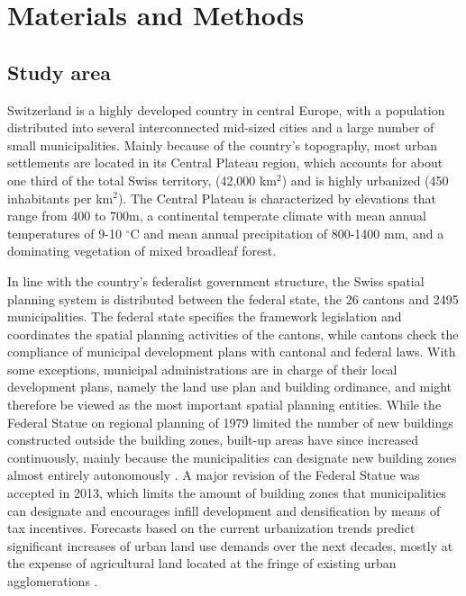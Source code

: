 \section*{Materials and Methods}

\subsection*{Study area}

Switzerland is a highly developed country in central Europe, with a population distributed into several interconnected mid-sized cities and a large number of small municipalities.
Mainly because of the country's topography, most urban settlements are located in its Central Plateau region, which accounts for about one third of the total Swiss territory, (42,000 km$^2$) and is highly urbanized (450 inhabitants per km$^2$).
The Central Plateau is characterized by elevations that range from 400 to 700m, a continental temperate climate with mean annual temperatures of 9-10 $^{\circ}$C and mean annual precipitation of 800-1400 mm, and a dominating vegetation of mixed broadleaf forest.

In line with the country's federalist government structure, the Swiss spatial planning system is distributed between the federal state, the 26 cantons and 2495 municipalities. The federal state specifies the framework legislation and coordinates the spatial planning activities of the cantons, while cantons check the compliance of municipal development plans with cantonal and federal laws. With some exceptions, municipal administrations are in charge of their local development plans, namely the land use plan and building ordinance, and might therefore be viewed as the most important spatial planning entities.
While the Federal Statue on regional planning of 1979 limited the number of new buildings constructed outside the building zones, built-up areas have since increased continuously, mainly because the municipalities can designate new building zones almost entirely autonomously \citep{jaeger2014improving}. A major revision of the Federal Statue was accepted in 2013, which limits the amount of building zones that municipalities can designate and encourages infill development and densification by means of tax incentives.
Forecasts based on the current urbanization trends predict significant increases of urban land use demands over the next decades, mostly at the expense of agricultural land located at the fringe of existing urban agglomerations \citep{price2015future}.

